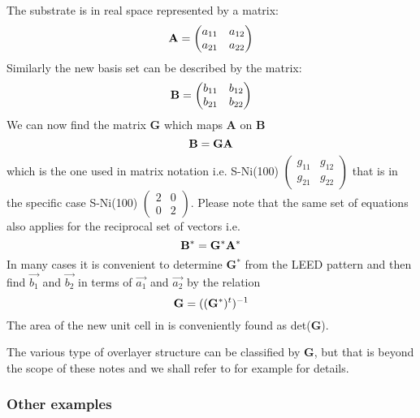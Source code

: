 The substrate is in real space represented by a matrix:
\begin{equation}
{\bf A} =  \begin{pmatrix} a_{11} &  a_{12}\\ a_{21} & a_{22}
\end{pmatrix}
\end{equation}
Similarly the new basis set can be described by the matrix:
\begin{equation}
{\bf B} = \begin{pmatrix}b_{11}&b_{12}\\b_{21}&b_{22}\end{pmatrix}
\end{equation}
We can now find the matrix {\bf G} which maps {\bf A} on {\bf B}
\begin{equation}
{\bf B}={\bf GA}
\end{equation}
which is the one used in matrix notation i.e. S-Ni(100) $\begin{pmatrix} g_{11}&g_{12}\\g_{21}& g_{22}\end{pmatrix}$ that is in the specific case S-Ni(100) $\begin{pmatrix} 2 & 0\\ 0 & 2\end{pmatrix}$. 
Please note that the same set of equations also applies for the reciprocal set of vectors i.e.
\begin{equation}
{\bf B^*}={\bf G^*A^*}
\end{equation}
In many cases it is convenient to determine {\bf G$^{*}$} from the LEED pattern and then find  $\overrightarrow{b_1}$ and $\overrightarrow{b_2}$ in terms of $\overrightarrow{a_1}$ and $\overrightarrow{a_2}$ by the relation
\begin{equation}
{\bf G}=(({\bf G^{*}})^{t})^{-1}
\end{equation}
The area of the new unit cell in is conveniently found as det({\bf G}).

The various type of overlayer structure can be classified by {\bf G}, but that is beyond the scope of these notes and we shall refer to for example \cite{Ertl, woodruff} for details.



\subsubsection{Other examples}

